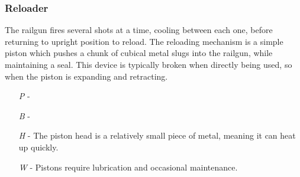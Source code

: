 \documentclass[a4paper]{article}
\begin{document}
\vspace{-0.5cm} \hspace{-18pt} \subsubsection{Reloader} \label{railgun_reloader} \vspace{-0.2cm}
The railgun fires several shots at a time, cooling between each one, before returning to upright position to reload. The reloading mechanism is a simple piston which pushes a chunk of cubical metal slugs into the railgun, while maintaining a seal. This device is typically broken when directly being used, so when the piston is expanding and retracting.
\begin{enumerate}
\item [\textit{P}] -  \\
\item [\textit{B}] -  \\
\item [\textit{H}] - The piston head is a relatively small piece of metal, meaning it can heat up quickly.
\item [\textit{W}] - Pistons require lubrication and occasional maintenance.
\end{enumerate}
\end{document}
